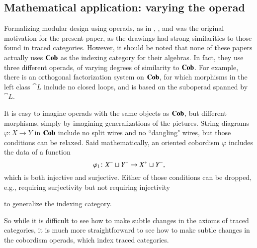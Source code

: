 \documentclass[12pt,oneside,article,draft]{memoir}
\begin{document}
\subsection{Mathematical application: varying the operad}

Formalizing modular design using operads, as in \cite{Spivak}, \cite{Rupel-Spivak}, and \cite{Vagner-Spivak-Lerman} was the original motivation for the present paper, as the drawings had strong similarities to those found in traced categories. However, it should be noted that none of these papers actually uses $\mathbf{Cob}$ as the indexing category for their algebras. In fact, they use three different operads, of varying degrees of similarity to $\mathbf{Cob}$. For example, there is an orthogonal factorization system on $\mathbf{Cob}$, for which morphisms in the left class $\cat{L}$ include no closed loops, and \cite{Vagner-Spivak-Lerman} is based on the suboperad spanned by $\cat{L}$.

It is easy to imagine operads with the same objects as $\mathbf{Cob}$, but different morphisms, simply by imagining generalizations of the pictures. String diagrams $\varphi\colon X\to Y$ in $\mathbf{Cob}$ include no split wires and no ``dangling" wires, but those conditions can be relaxed. Said mathematically, an oriented cobordism $\varphi$ includes the data of a function
$$\varphi_1\colon X^-\sqcup Y^+\to X^+\sqcup Y^-,$$
which is both injective and surjective. Either of those conditions can be dropped, e.g., requiring surjectivity but not requiring injectivity
\begin{center}
\end{center}
to generalize the indexing category. 

So while it is difficult to see how to make subtle changes in the axioms of traced categories, it is much more straightforward to see how to make subtle changes in the cobordism operads, which index traced categories.
\end{document}
